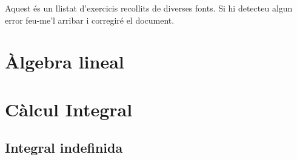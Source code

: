\documentclass[12pt]{article}
\begin{document}
Aquest és un llistat d'exercicis recollits de diverses fonts. Si hi detecteu algun error feu-me'l arribar i corregiré el document.
%
\begin{ExerciseList}

\section{Àlgebra lineal}













%


















%
% 
% 
% 
% 
% 






\section{Càlcul Integral}

\subsection{Integral indefinida}










\end{ExerciseList}
\end{document}
